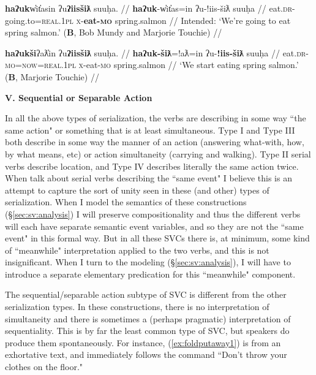 \ex \label{ex:*eateat4}
\begingl
\glpreamble *\textbf{haʔuk}w̓it̓asin ʔu\textbf{ʔiisšiƛ} suuḥa. //
\gla \textbf{haʔuk}-w̓it̓as=in ʔu-!iis-šiƛ suuḥa //
\glb eat.\textsc{dr}-going.to=\textsc{real.1pl} \textsc{x}-\textbf{eat-\textsc{mo}} spring.salmon //
\glft Intended: `We're going to eat spring salmon.' (\textbf{B}, Bob Mundy and Marjorie Touchie) //
\endgl
\xe

\ex \label{ex:eateat5}
\begingl
\glpreamble \textbf{haʔukši}ʔaƛ̓in ʔu\textbf{ʔiisšiƛ} suuḥa. //
\gla \textbf{haʔuk-šiƛ}=!aƛ=in ʔu-\textbf{!iis-šiƛ} suuḥa //
\glb eat.\textsc{dr}-\textsc{mo}=\textsc{now}=\textsc{real.1pl} \textsc{x}-eat-\textsc{mo} spring.salmon //
\glft `We start eating spring salmon.' (\textbf{B}, Marjorie Touchie) //
\endgl
\xe

\vspace{10pt}

\noindent \textbf{V. Sequential or Separable Action}

\vspace{10pt}

In all the above types of serialization, the verbs are describing in some way ``the same action" or something that is at least simultaneous. Type I and Type III both describe in some way the manner of an action (answering what-with, how, by what means, etc) or action simultaneity (carrying and walking). Type II serial verbs describe location, and Type IV describes literally the same action twice. When \cite{aikhenvalddixon2006} talk about serial verbs describing the ``same event" I believe this is an attempt to capture the sort of unity seen in these (and other) types of serialization. When I model the semantics of these constructions (\S\ref{sec:sv:analysis}) I will preserve compositionality and thus the different verbs will each have separate semantic event variables, and so they are not the ``same event" in this formal way. But in all these SVCs there is, at minimum, some kind of ``meanwhile" interpretation applied to the two verbs, and this is not insignificant. When I turn to the modeling (\S\ref{sec:sv:analysis}), I will have to introduce a separate elementary predication for this ``meanwhile" component.

The sequential/separable action subtype of SVC is different from the other serialization types. In these constructions, there is no interpretation of simultaneity and there is sometimes a (perhaps pragmatic) interpretation of sequentiality. This is by far the least common type of SVC, but speakers do produce them spontaneously. For instance, (\ref{ex:foldputaway1}) is from an exhortative text, and immediately follows the command ``Don't throw your clothes on the floor."

